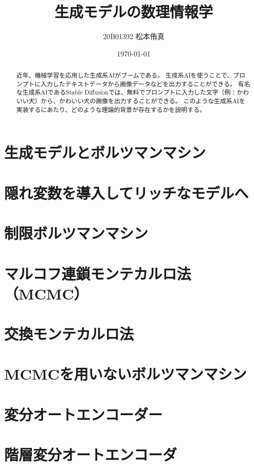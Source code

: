 \documentclass[a4paper,11pt,uplatex]{jsarticle}%
\title{生成モデルの数理情報学}
\author{20B01392 松本侑真}
\date{\today}
\begin{document}
\maketitle
\begin{abstract}
近年、機械学習を応用した生成系AIがブームである。
生成系AIを使うことで、プロンプトに入力したテキストデータから画像データなどを出力することができる。
有名な生成系AIであるStable Diffusionでは、無料でプロンプトに入力した文字（例：かわいい犬）から、かわいい犬の画像を出力することができる。
このような生成系AIを実装するにあたり、どのような理論的背景が存在するかを説明する。
\end{abstract}
\tableofcontents
\newpage

\section{生成モデルとボルツマンマシン}

\section{隠れ変数を導入してリッチなモデルへ}

\section{制限ボルツマンマシン}

\section{マルコフ連鎖モンテカルロ法（MCMC）}

\section{交換モンテカルロ法}

\section{MCMCを用いないボルツマンマシン}

\section{変分オートエンコーダー}

\section{階層変分オートエンコーダ}
\end{document}
